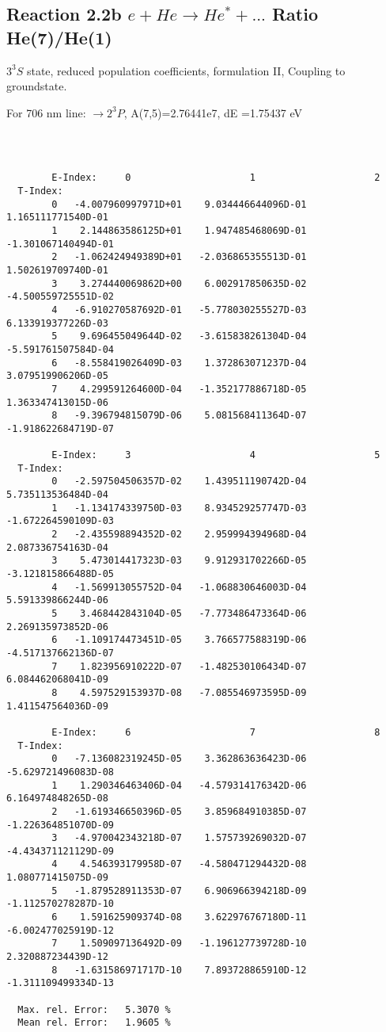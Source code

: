 \documentclass[12pt]{article}
\begin{document}
\subsection{
  Reaction 2.2b $e + He \rightarrow He^* + ... $ Ratio He(7)/He(1)
}

  $3^3S$ state,
  reduced population coefficients, formulation II,
  Coupling to groundstate.

  For 706 nm line: $\rightarrow 2^3P$, A(7,5)=2.76441e7, dE =1.75437 eV

\begin{small}\begin{verbatim}



        E-Index:     0                     1                     2
  T-Index:
        0   -4.007960997971D+01    9.034446644096D-01    1.165111771540D-01
        1    2.144863586125D+01    1.947485468069D-01   -1.301067140494D-01
        2   -1.062424949389D+01   -2.036865355513D-01    1.502619709740D-01
        3    3.274440069862D+00    6.002917850635D-02   -4.500559725551D-02
        4   -6.910270587692D-01   -5.778030255527D-03    6.133919377226D-03
        5    9.696455049644D-02   -3.615838261304D-04   -5.591761507584D-04
        6   -8.558419026409D-03    1.372863071237D-04    3.079519906206D-05
        7    4.299591264600D-04   -1.352177886718D-05    1.363347413015D-06
        8   -9.396794815079D-06    5.081568411364D-07   -1.918622684719D-07

        E-Index:     3                     4                     5
  T-Index:
        0   -2.597504506357D-02    1.439511190742D-04    5.735113536484D-04
        1   -1.134174339750D-03    8.934529257747D-03   -1.672264590109D-03
        2   -2.435598894352D-02    2.959994394968D-04    2.087336754163D-04
        3    5.473014417323D-03    9.912931702266D-05   -3.121815866488D-05
        4   -1.569913055752D-04   -1.068830646003D-04    5.591339866244D-06
        5    3.468442843104D-05   -7.773486473364D-06    2.269135973852D-06
        6   -1.109174473451D-05    3.766577588319D-06   -4.517137662136D-07
        7    1.823956910222D-07   -1.482530106434D-07    6.084462068041D-09
        8    4.597529153937D-08   -7.085546973595D-09    1.411547564036D-09

        E-Index:     6                     7                     8
  T-Index:
        0   -7.136082319245D-05    3.362863636423D-06   -5.629721496083D-08
        1    1.290346463406D-04   -4.579314176342D-06    6.164974848265D-08
        2   -1.619346650396D-05    3.859684910385D-07   -1.226364851070D-09
        3   -4.970042343218D-07    1.575739269032D-07   -4.434371121129D-09
        4    4.546393179958D-07   -4.580471294432D-08    1.080771415075D-09
        5   -1.879528911353D-07    6.906966394218D-09   -1.112570278287D-10
        6    1.591625909374D-08    3.622976767180D-11   -6.002477025919D-12
        7    1.509097136492D-09   -1.196127739728D-10    2.320887234439D-12
        8   -1.631586971717D-10    7.893728865910D-12   -1.311109499334D-13

  Max. rel. Error:   5.3070 %
  Mean rel. Error:   1.9605 %


\end{verbatim}\end{small}
\end{document}
